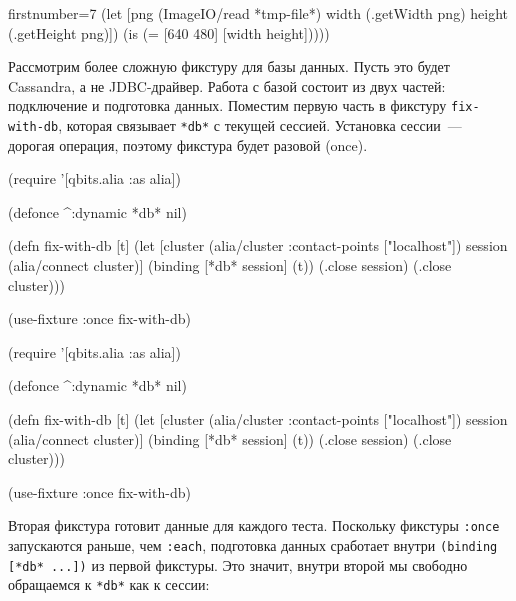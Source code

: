 \else

\begin{english}
  \begin{clojure/lines*}{firstnumber=7}
    (let [png (ImageIO/read *tmp-file*)
          width (.getWidth png)
          height (.getHeight png)])
    (is (= [640 480] [width height]))))
  \end{clojure/lines*}
\end{english}
\fi



Рассмотрим более сложную фикстуру для базы данных. Пусть это будет Cassandra, а
не JDBC-драйвер. Работа с базой состоит из двух частей: подключение и подготовка
данных. Поместим первую часть в фикстуру \verb|fix-with-db|, которая связывает
\verb|*db*| с текущей сессией. Установка сессии~--- дорогая операция, поэтому
фикстура будет разовой (once).

\ifx\DEVICETYPE\MOBILE

\begin{english}
  \begin{clojure}
(require '[qbits.alia :as alia])

(defonce ^:dynamic *db* nil)

(defn fix-with-db [t]
  (let [cluster (alia/cluster
                  {:contact-points
                   ["localhost"]})
        session (alia/connect cluster)]
    (binding [*db* session]
      (t))
    (.close session)
    (.close cluster)))

(use-fixture :once fix-with-db)
  \end{clojure}
\end{english}

\else

\begin{english}
  \begin{clojure}
(require '[qbits.alia :as alia])

(defonce ^:dynamic *db* nil)

(defn fix-with-db [t]
  (let [cluster (alia/cluster {:contact-points ["localhost"]})
        session (alia/connect cluster)]
    (binding [*db* session]
      (t))
    (.close session)
    (.close cluster)))

(use-fixture :once fix-with-db)
  \end{clojure}
\end{english}

\fi

Вторая фикстура готовит данные для каждого теста. Поскольку фикстуры
\verb|:once| запускаются раньше, чем \verb|:each|, подготовка данных сработает
внутри \verb|(binding [*db* ...])| из первой фикстуры. Это значит, внутри второй
мы свободно обращаемся к \verb|*db*| как к сессии:

